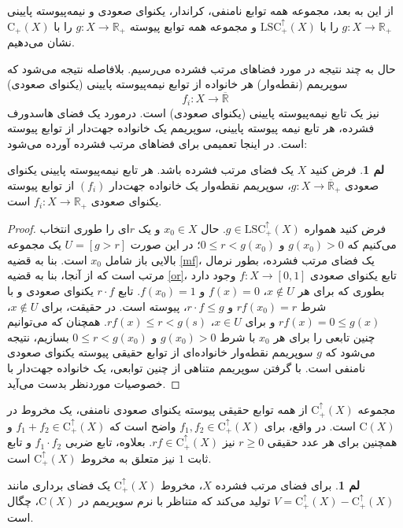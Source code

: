 \documentclass[12pt,a4paper]{article}
\theoremstyle{definition}
\theoremstyle{theorem}
\newtheorem{lemma}[definition]{لم}
\theoremstyle{definition}
\newcommand{\rC}{\mathrm{C}}
\begin{document}
   از این به بعد، مجموعه همه توابع نامنفی، کراندار، یکنوای صعودی و نیمه‌پیوسته پایینی 
 $ g:X\rightarrow \mathbb{R}_{+} $
 را با 
 $ \mathrm{LSC}_{+}^{\uparrow}(X) $
 و مجموعه همه توابع پیوسته 
 $ g:X\rightarrow \mathbb{R}_{+} $
 را با
$ \rC_{+}(X) $\index{$ \rC_{+}(X) $}
نشان می‌دهیم.

حال  به چند نتیجه در مورد فضاهای مرتب فشرده می‌رسیم.  بلافاصله نتیجه می‌شود که سوپریمم (نقطه‌وار) هر خانواده از توابع نیمه‌پیوسته پایینی (یکنوای صعودی)
$$ f_{i}:X\rightarrow \overline{\mathbb{R}} $$
 نیز یک تابع نیمه‌پیوسته پایینی (یکنوای صعودی) است. درمورد یک فضای هاسدورف فشرده، هر تابع نیمه پیوسته پایینی، سوپریمم یک خانواده جهت‌دار از توابع پیوسته است. در اینجا تعمیمی برای فضاهای مرتب فشرده آورده می‌شود:

\begin{lemma}\label{1.1} 
فرض کنید
$ X $
یک فضای مرتب فشرده باشد. هر تابع نیمه‌پیوسته پایینی یکنوای صعودی   
$ g:X \rightarrow \overline{\mathbb{R}}_{+}$،   سوپریمم نقطه‌وار یک خانواده جهت‌دار 
$\left( f_{i}\right)$
از توابع پیوسته یکنوای صعودی 
$ f_{i}:X\rightarrow \mathbb{R}_{+}$
است.

\end{lemma}
\begin {proof}
فرض کنید همواره 
$ g\in \mathrm{LSC}_{+}^{\uparrow}(X) $. حال
$ x_{0} \in X  $
و یک 
$ r $ای را طوری انتخاب می‌کنیم که
$ g(x_{0}) >0 $
و
$ 0\leq r< g(x_{0}) $؛  در این صورت 
$ U=[g>r] $
یک مجموعه بالایی باز شامل 
$ x_{0} $
است. بنا به  قضیه \ref{mf}، یک فضای مرتب فشرده، بطور نرمال مرتب است که از آنجا، بنا به قضیه \ref{or}، تابع یکنوای صعودی  
$ f:X\rightarrow [0,1] $
وجود دارد بطوری که برای هر
$ x \notin U$، 
$ f(x)=0 $
و
$ f(x_{0})=1$. تابع 
$ r\cdot f $
یکنوای صعودی  و با شرط 
$ rf(x_{0})=r $
و
$ r\cdot f \leq g $،  پیوسته است. در حقیقت، برای 
$ x \notin U$، 
$ rf(x)=0\leq g(x) $
و برای 
$ x\in U $، 
$ rf(x)\leq r <g(s) $.  همچنان که می‌توانیم چنین تابعی را برای هر
$ x_{0} $
با شرط 
$ g(x_{0})>0 $
و
$ 0\leq r<g(x_{0}) $
بسازیم،  نتیجه می‌شود که 
$ g $
سوپریمم نقطه‌وار خانواده‌ای از توابع حقیقی پیوسته یکنوای صعودی  نامنفی است. با گرفتن سوپریمم متناهی از چنین توابعی، یک خانواده جهت‌دار با خصوصیات موردنظر بدست می‌آید. 

\end{proof}

مجموعه 
$ \rC_{+}^{\uparrow} (X)$
از همه توابع حقیقی پیوسته یکنوای صعودی  نامنفی، یک مخروط در 
$ \rC(X) $
است. در واقع، برای 
$ f_{1},f_{2}\in \rC_{+}^{\uparrow} (X) $
واضح است که 
$  f_{1}+f_{2}\in \rC_{+}^{\uparrow} (X) $
و همچنین برای هر عدد حقیقی 
$ r\geq 0 $
نیز
$ rf\in \rC_{+}^{\uparrow} (X) $. بعلاوه، تابع ضربی 
$ f_{1}\cdot f_{2} $
و تابع ثابت $ 1 $ نیز متعلق به مخروط 
$\rC_{+}^{\uparrow} (X)$
است.
\begin{lemma}\label{۱.۲} 
برای فضای مرتب فشرده 
$ X $، مخروط 
$\rC_{+}^{\uparrow} (X)$
یک فضای برداری مانند
\linebreak
$ V=\rC_{+}^{\uparrow} (X) - \rC_{+}^{\uparrow} (X) $
تولید می‌کند که متناظر با نرم سوپریمم در 
$ \rC(X) $، چگال است.

\end{lemma}
\end{document}

